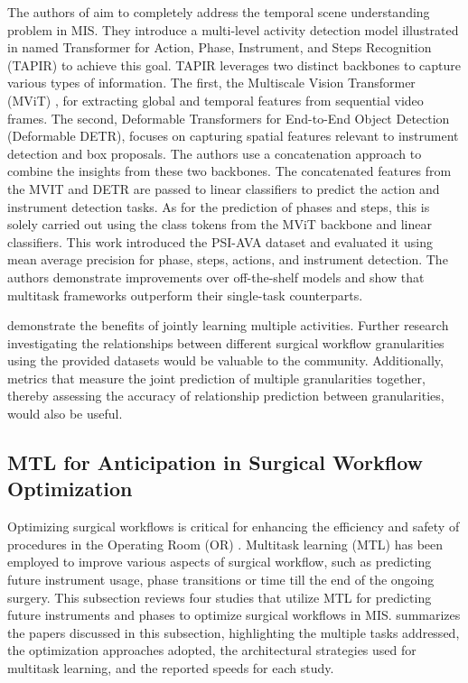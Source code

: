 The authors of \citet{holistic_scene_understanding} aim to completely address the temporal scene understanding problem in MIS.
They introduce a multi-level activity detection model illustrated in  named Transformer for Action, Phase, Instrument, and Steps Recognition (TAPIR) to achieve this goal.
TAPIR leverages two distinct backbones to capture various types of information. The first, the Multiscale Vision Transformer (MViT) \citep{fan2021multiscale}, for extracting global and temporal features from sequential video frames. The second, Deformable Transformers for End-to-End Object Detection (Deformable DETR), focuses on capturing spatial features relevant to instrument detection and box proposals.
The authors use a concatenation approach to combine the insights from these two backbones. The concatenated features from the MVIT and DETR are passed to linear classifiers to predict the action and instrument detection tasks. As for the prediction of phases and steps, this is solely carried out using the class tokens from the MViT backbone and linear classifiers. This work introduced the PSI-AVA dataset and evaluated it using mean average precision for phase, steps, actions, and instrument detection. The authors demonstrate improvements over off-the-shelf models and show that multitask frameworks outperform their single-task counterparts.


\citet{holistic_scene_understanding,Ramesh2021_phase_step_gastric_bypass} demonstrate the benefits of jointly learning multiple activities. Further research investigating the relationships between different surgical workflow granularities using the provided datasets would be valuable to the community. Additionally, metrics that measure the joint prediction of multiple granularities together, thereby assessing the accuracy of relationship prediction between granularities, would also be useful.



\subsection{MTL for Anticipation in Surgical Workflow Optimization}
Optimizing surgical workflows is critical for enhancing the efficiency and safety of procedures in the Operating Room (OR) \cite{yuan2022anticipation}. Multitask learning (MTL) has been employed to improve various aspects of surgical workflow, such as predicting future instrument usage, phase transitions or time till the end of the ongoing surgery. This subsection reviews four studies that utilize MTL for predicting future instruments and phases to optimize surgical workflows in MIS.
 summarizes the papers discussed in this subsection, highlighting the multiple tasks addressed, the optimization approaches adopted, the architectural strategies used for multitask learning, and the reported speeds for each study.

